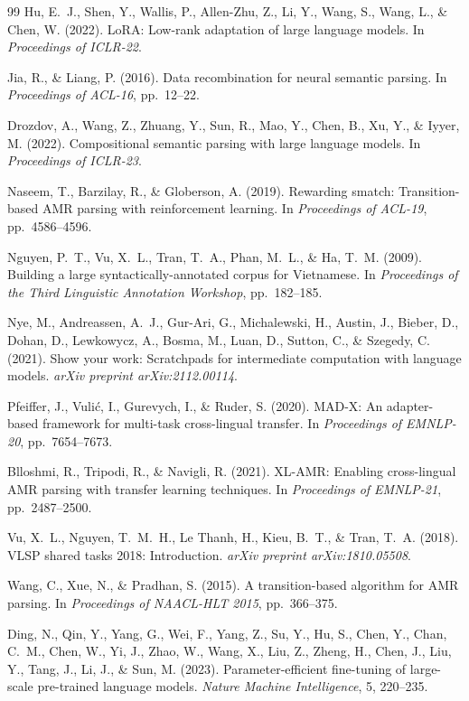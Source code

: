 \documentclass[11pt,a4paper]{article}
\begin{document}
\begin{thebibliography}{99}
Hu, E.\ J., Shen, Y., Wallis, P., Allen-Zhu, Z., Li, Y., Wang, S., Wang, L.,
\& Chen, W. (2022).
LoRA: Low-rank adaptation of large language models.
In \textit{Proceedings of ICLR-22}.

Jia, R., \& Liang, P. (2016).
Data recombination for neural semantic parsing.
In \textit{Proceedings of ACL-16}, pp.\ 12--22.

Drozdov, A., Wang, Z., Zhuang, Y., Sun, R., Mao, Y., Chen, B., Xu, Y., \&
Iyyer, M. (2022).
Compositional semantic parsing with large language models.
In \textit{Proceedings of ICLR-23}.

Naseem, T., Barzilay, R., \& Globerson, A. (2019).
Rewarding smatch: Transition-based AMR parsing with reinforcement learning.
In \textit{Proceedings of ACL-19}, pp.\ 4586--4596.

Nguyen, P.\ T., Vu, X.\ L., Tran, T.\ A., Phan, M.\ L., \& Ha, T.\ M. (2009).
Building a large syntactically-annotated corpus for Vietnamese.
In \textit{Proceedings of the Third Linguistic Annotation Workshop}, pp.\ 182--185.

Nye, M., Andreassen, A.\ J., Gur-Ari, G., Michalewski, H., Austin, J., Bieber,
D., Dohan, D., Lewkowycz, A., Bosma, M., Luan, D., Sutton, C., \& Szegedy, C.
(2021).
Show your work: Scratchpads for intermediate computation with language models.
\textit{arXiv preprint arXiv:2112.00114}.

Pfeiffer, J., Vulić, I., Gurevych, I., \& Ruder, S. (2020).
MAD-X: An adapter-based framework for multi-task cross-lingual transfer.
In \textit{Proceedings of EMNLP-20}, pp.\ 7654--7673.

Blloshmi, R., Tripodi, R., \& Navigli, R. (2021).
XL-AMR: Enabling cross-lingual AMR parsing with transfer learning techniques.
In \textit{Proceedings of EMNLP-21}, pp.\ 2487--2500.

Vu, X.\ L., Nguyen, T.\ M.\ H., Le Thanh, H., Kieu, B.\ T., \& Tran, T.\ A.
(2018).
VLSP shared tasks 2018: Introduction.
\textit{arXiv preprint arXiv:1810.05508}.

Wang, C., Xue, N., \& Pradhan, S. (2015).
A transition-based algorithm for AMR parsing.
In \textit{Proceedings of NAACL-HLT 2015}, pp.\ 366--375.

Ding, N., Qin, Y., Yang, G., Wei, F., Yang, Z., Su, Y., Hu, S., Chen, Y., Chan,
C.\ M., Chen, W., Yi, J., Zhao, W., Wang, X., Liu, Z., Zheng, H., Chen, J., Liu,
Y., Tang, J., Li, J., \& Sun, M. (2023).
Parameter-efficient fine-tuning of large-scale pre-trained language models.
\textit{Nature Machine Intelligence}, 5, 220--235.


\end{thebibliography}
\end{document}
